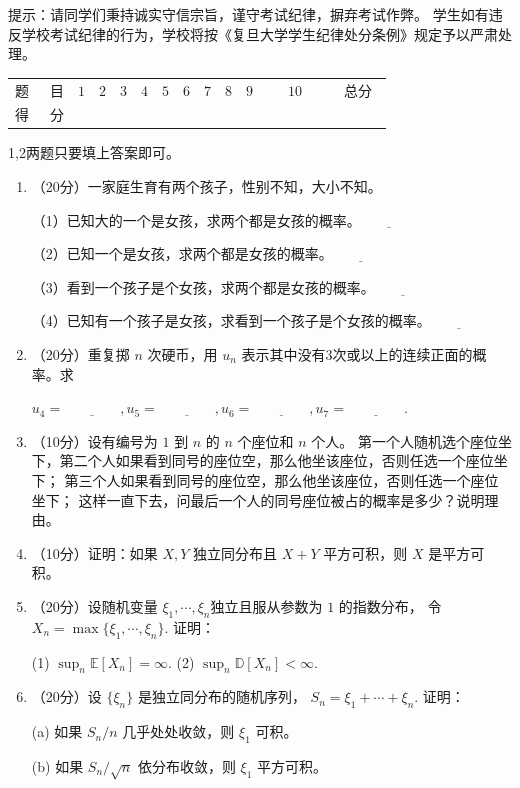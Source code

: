 提示：请同学们秉持诚实守信宗旨，谨守考试纪律，摒弃考试作弊。
学生如有违反学校考试纪律的行为，学校将按《复旦大学学生纪律处分条例》规定予以严肃处理。

\begin{table}\begin{tabular}{|c|c|c|c|}
题\ \ \ 目 &\quad$1$\quad&\quad$2$\quad&\quad$3$\quad&\quad$4$\quad&\quad$5$\quad&\quad$6$\quad&\quad$7$\quad&\quad$8$\quad&\quad$9$\quad&\ \ \ $10$\ \ \ &\ 总分\ \\
得\ \ \ 分 & & & & & & & & & & & 
\end{tabular}\end{table}
1,2两题只要填上答案即可。
\begin{enumerate}
\item（20分）一家庭生育有两个孩子，性别不知，大小不知。

（1）已知大的一个是女孩，求两个都是女孩的概率。$\underline{\qquad\qquad}$

（2）已知一个是女孩，求两个都是女孩的概率。$\underline{\qquad\qquad}$

（3）看到一个孩子是个女孩，求两个都是女孩的概率。$\underline{\qquad\qquad}$

（4）已知有一个孩子是女孩，求看到一个孩子是个女孩的概率。$\underline{\qquad\qquad}$

\item（20分）重复掷 $n$ 次硬币，用 $u_n$ 表示其中没有$3$次或以上的连续正面的概率。求

$u_4=\underline{\qquad\qquad},u_5=\underline{\qquad\qquad},
u_6=\underline{\qquad\qquad},u_7=\underline{\qquad\qquad}$.

\item（10分）设有编号为 $1$ 到 $n$ 的 $n$ 个座位和 $n$ 个人。
第一个人随机选个座位坐下，第二个人如果看到同号的座位空，那么他坐该座位，否则任选一个座位坐下；
第三个人如果看到同号的座位空，那么他坐该座位，否则任选一个座位坐下；
这样一直下去，问最后一个人的同号座位被占的概率是多少？说明理由。

\item（10分）证明：如果 $X,Y$ 独立同分布且 $ X+Y $ 平方可积，则 $X$ 是平方可积。

\item（20分）设随机变量 $\xi_{1}, \cdots, \xi_{n}$独立且服从参数为 $1$ 的指数分布，
令 $X_{n} = \max\{\xi_1,\cdots,\xi_n\}$. 证明：

(1) $\sup_{n} \mathbb{E}[ X_{n} ]  = \infty$.
(2) $\sup_{n} \mathbb{D}[ X_{n} ]  < \infty$.

\item（20分）设  $\{\xi_{n}\}$ 是独立同分布的随机序列，
$S_{n} = \xi_{1}+\cdots+\xi_{n}$. 证明：

(a) 如果 $S_{n}/n$ 几乎处处收敛，则 $\xi_{1}$ 可积。

(b) 如果 $S_{n}/\sqrt{n}$ 依分布收敛，则 $\xi_{1}$ 平方可积。
\end{enumerate}